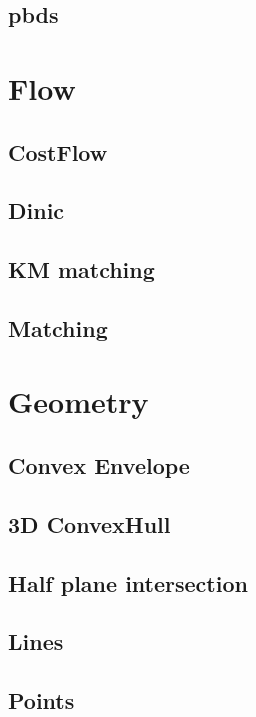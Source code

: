 \subsection{pbds}


\section{Flow}
\subsection{CostFlow}

\subsection{Dinic}

\subsection{KM matching}

\subsection{Matching}


\section{Geometry}
\subsection{Convex Envelope}

\subsection{3D ConvexHull}

\subsection{Half plane intersection}

\subsection{Lines}

\subsection{Points}

